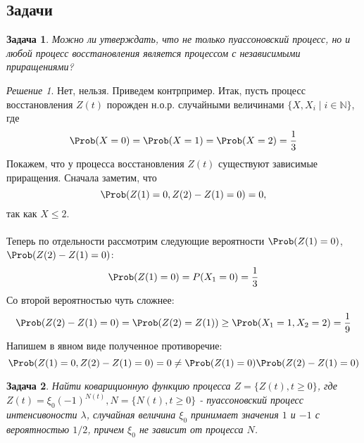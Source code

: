 \documentclass[a4paper]{article}
\theoremstyle{plain}
\newtheorem{prob}{Задача}[section]
\theoremstyle{definition}
\theoremstyle{remark}
\theoremstyle{nonumberplain}
\theoremstyle{nonumberplain}
\newtheorem{solution}{Решение}
\begin{document}
\subsection{Задачи}
\begin{prob}
Можно ли утверждать, что не только пуассоновский процесс, но и любой процесс восстановления является процессом с независимыми приращениями?
\end{prob}
\begin{solution}
Нет, нельзя. Приведем контрпример. Итак, пусть процесс восстановления $Z(t)$ порожден н.о.р. случайными величинами $\{X,X_i \; | \; i \in \mathbb{N}\}$, где
\begin{equation*}
\Prob(X = 0) = \Prob(X = 1) = \Prob(X = 2) = \frac{1}{3}
\end{equation*}
Покажем, что у процесса восстановления $Z(t)$ существуют зависимые приращения. Сначала заметим, что
\begin{equation*}
\Prob(Z(1) = 0, Z(2)-Z(1) = 0) = 0,
\end{equation*}
так как $X \leq 2$.
\\
\\
Теперь по отдельности рассмотрим следующие вероятности $\Prob(Z(1) = 0)$, $\Prob(Z(2)-Z(1) = 0)$:
\begin{equation*}
\Prob(Z(1) = 0) = P(X_1 = 0) = \frac{1}{3}
\end{equation*}
Со второй вероятностью чуть сложнее:
\begin{equation*}
\Prob(Z(2)-Z(1) = 0) = \Prob(Z(2) = Z(1)) \geq \Prob(X_1 = 1, X_2 = 2) = \frac{1}{9}
\end{equation*}
Напишем в явном виде полученное противоречие:
\begin{equation*}
\Prob(Z(1) = 0, Z(2)-Z(1) = 0) = 0 \neq  \Prob(Z(1) = 0) \Prob(Z(2)-Z(1) = 0)
\end{equation*}
\end{solution}

\begin{prob}
  Найти ковариционную функцию процесса $Z = \{ Z(t), t \geq 0 \}$, где $Z(t) = \xi_0(-1)^{N(t)}, N = \{N(t),t \geq 0\}$ - пуассоновский         процесс интенсивоности $\lambda$, случайная величина $\xi_0$ принимает значения $1$ и $-1$ с вероятностью $1/2$, причем $\xi_0$ не  зависит от процесса $N$.
\end{prob}
\end{document}
